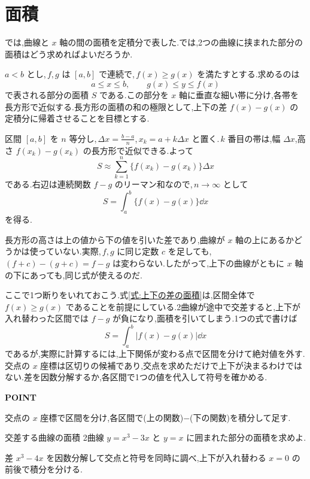 \section{面積}\label{節:曲線間の面積}

では,曲線と $x$ 軸の間の面積を定積分で表した.では,2つの曲線に挟まれた部分の面積はどう求めればよいだろうか.

$a<b$ とし,\,$f,g$ は $[a,b]$ で連続で,\,$f(x)\ge g(x)$ を満たすとする.求めるのは
\[
a\le x\le b,\qquad g(x)\le y\le f(x)
\]
で表される部分の面積 $S$ である.この部分を $x$ 軸に垂直な細い帯に分け,各帯を長方形で近似する.長方形の面積の和の極限として,上下の差 $f(x)-g(x)$ の定積分に帰着させることを目標とする.

区間 $[a,b]$ を $n$ 等分し,\,$\Delta x=\frac{b-a}{n}$,\,$x_k=a+k\Delta x$ と置く.\,$k$ 番目の帯は,幅 $\Delta x$,高さ $f(x_k)-g(x_k)$ の長方形で近似できる.よって
\[
S\approx\sum_{k=1}^n\{f(x_k)-g(x_k)\}\Delta x
\]
である.右辺は連続関数 $f-g$ のリーマン和なので,\,$n\to\infty$ として
\begin{equation}\label{式:上下の差の面積}
S=\int_a^b\{f(x)-g(x)\}\dd x
\end{equation}
を得る.

長方形の高さは上の値から下の値を引いた差であり,曲線が $x$ 軸の上にあるかどうかは使っていない.実際,\,$f,g$ に同じ定数 $c$ を足しても,\,$(f+c)-(g+c)=f-g$ は変わらない.したがって,上下の曲線がともに $x$ 軸の下にあっても,同じ式が使えるのだ.

ここで1つ断りをいれておこう.式\eqref{式:上下の差の面積}は,区間全体で $f(x)\ge g(x)$ であることを前提にしている.2曲線が途中で交差すると,上下が入れ替わった区間では $f-g$ が負になり,面積を引いてしまう.1つの式で書けば
\[
S=\int_a^b|f(x)-g(x)|\dd x
\]
であるが,実際に計算するには,上下関係が変わる点で区間を分けて絶対値を外す.交点の $x$ 座標は区切りの候補であり,交点を求めただけで上下が決まるわけではない.差を因数分解するか,各区間で1つの値を代入して符号を確かめる.

\begin{bookpoint}
\textbf{POINT}\par
交点の $x$ 座標で区間を分け,各区間で(上の関数)$-$(下の関数)を積分して足す.
\end{bookpoint}

\begin{example}{交差する曲線の面積}
2曲線 $y=x^3-3x$ と $y=x$ に囲まれた部分の面積を求めよ.
\end{example}

差 $x^3-4x$ を因数分解して交点と符号を同時に調べ,上下が入れ替わる $x=0$ の前後で積分を分ける.

